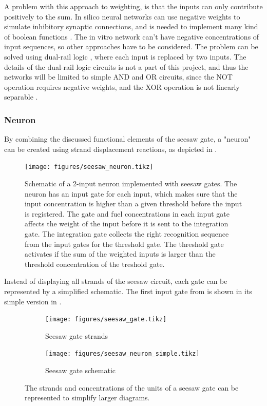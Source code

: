 A problem with this approach to weighting, is that the inputs can only contribute positively to the sum. In silico neural networks can use negative weights to simulate inhibitory synaptic connections, and is needed to implement many kind of boolean functions \cite{ZhaoYanling}. The in vitro network can't have negative concentrations of input sequences, so other approaches have to be considered. The problem can be solved using dual-rail logic \cite{Qian2011}, where each input is replaced by two inputs. The details of the dual-rail logic circuits is not a part of this project, and thus the networks will be limited to simple AND and OR circuits, since the NOT operation requires negative weights, and the XOR operation is not linearly separable \cite{ZhaoYanling}.

\subsubsection{Neuron}
By combining the discussed functional elements of the seesaw gate, a "neuron" can be created using strand displacement reactions, as depicted in .

\begin{figure}[h]
\texttt{[image: figures/seesaw\_neuron.tikz]}
\caption{Schematic of a 2-input neuron implemented with seesaw gates. The neuron has an input gate for each input, which makes sure that the input concentration is higher than a given threshold before the input is registered. The gate and fuel concentrations in each input gate affects the weight of the input before it is sent to the integration gate. The integration gate collects the right recognition sequence from the input gates for the threshold gate. The threshold gate activates if the sum of the weighted inputs is larger than the threshold concentration of the treshold gate.}
\label{seesaw_neuron}
\end{figure}

Instead of displaying all strands of the seesaw circuit, each gate can be represented by a simplified schematic. The first input gate from  is shown in its simple version in .

\begin{figure}[h]
  \begin{subfigure}[t]{.49\textwidth}
    \texttt{[image: figures/seesaw\_gate.tikz]}
    \caption{Seesaw gate strands}
  \end{subfigure}
  \quad
  \begin{subfigure}[t]{.49\textwidth}
    \texttt{[image: figures/seesaw\_neuron\_simple.tikz]}
    \caption{Seesaw gate schematic}
  \end{subfigure}
  \caption{The strands and concentrations of the units of a seesaw gate can be represented to simplify larger diagrams.}
  \label{seesaw_gate_simple}
\end{figure}

